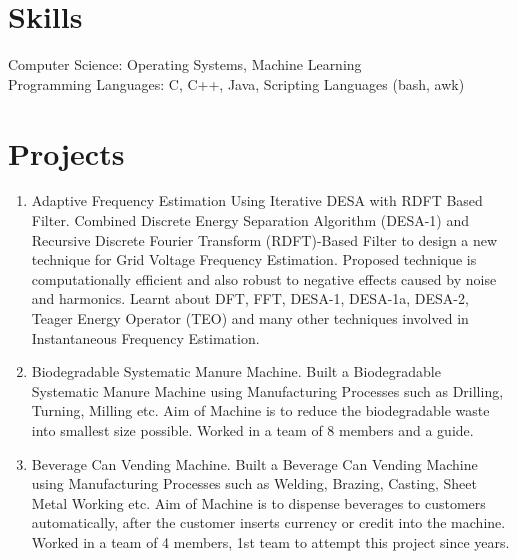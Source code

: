 \documentclass{article}
\begin{document}
\section*{\fontsize{10}{12}\selectfont Skills}
\vspace*{-2mm}
Computer Science\hspace{1.73 cm}:   Operating Systems, Machine Learning\\
Programming Languages\hspace{0.7 cm}:   C, C++, Java, Scripting Languages (bash, awk)\\
\vspace*{-5mm}
\section*{\fontsize{10}{12}\selectfont Projects}
\vspace*{-2mm}
\begin{enumerate}
    \item Adaptive Frequency Estimation Using Iterative DESA with RDFT Based Filter. Combined Discrete Energy Separation Algorithm (DESA-1) and Recursive Discrete Fourier Transform (RDFT)-Based Filter to design a new technique for Grid Voltage Frequency Estimation. Proposed technique is computationally efficient and also robust to negative effects caused by noise and harmonics. Learnt about DFT, FFT, DESA-1, DESA-1a, DESA-2, Teager Energy Operator (TEO) and many other techniques involved in Instantaneous Frequency Estimation.
    \item Biodegradable Systematic Manure Machine. Built a Biodegradable Systematic Manure Machine using Manufacturing Processes such as Drilling, Turning, Milling etc. Aim of Machine is to reduce the biodegradable waste into smallest size possible. Worked in a team of 8 members and a guide.
    \item Beverage Can Vending Machine. Built a Beverage Can Vending Machine using Manufacturing Processes such as Welding, Brazing, Casting, Sheet Metal Working etc. Aim of Machine is to dispense beverages to customers automatically, after the customer inserts currency or credit into the machine. Worked in a team of 4 members, 1st team to attempt this project since years.
\end{enumerate}
\vspace*{-2mm}
\end{document}
